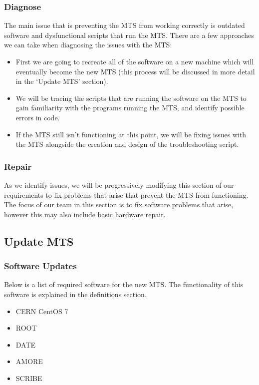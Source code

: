 \documentclass[12pt]{article}
\newcommand\tab[1][1cm]{\hspace*{#1}}
\begin{document}
\subsubsection*{Diagnose}
%
\tab The main issue that is preventing the MTS from working correctly is outdated software and dysfunctional scripts that run the MTS.  There are a few approaches we can take when diagnosing the issues with the MTS:
\begin{itemize}
	\item First we are going to recreate all of the software on a new machine which will eventually become the new MTS (this process will be discussed in more detail in the ‘Update MTS’ section).
	\item We will be tracing the scripts that are running the software on the MTS to gain familiarity with the programs running the MTS, and identify possible errors in code. 
	\item If the MTS still isn’t functioning at this point, we will be fixing issues with the MTS alongside the creation and design of the troubleshooting script.
	
\end{itemize}
\subsubsection*{Repair}
%
\tab As we identify issues, we will be progressively modifying this section of our requirements to fix problems that arise that prevent the MTS from functioning. The focus of our team in this section is to fix software problems that arise, however this may also include basic hardware repair.

\subsection*{Update MTS}
%
\subsubsection*{Software Updates}
%
\tab Below is a list of required software for the new MTS. The functionality of this software is explained in the definitions section.
\begin{itemize}
	\item CERN CentOS 7
	\item ROOT
	\item DATE
	\item AMORE
	\item SCRIBE
	
\end{itemize}
\end{document}
